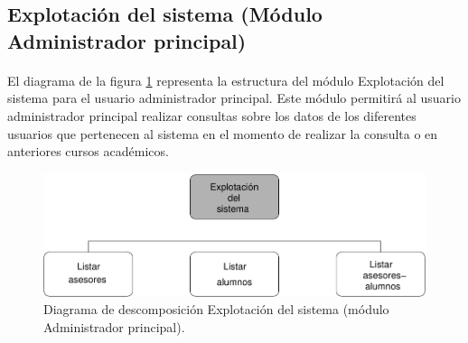 \subsection{Explotación del sistema (Módulo Administrador principal)}

  \paragraph{}El diagrama de la figura
  \ref{diagramaDescomposicionExplotacionSistema} representa la estructura del
  módulo Explotación del sistema para el usuario administrador principal.
  Este módulo permitirá al usuario administrador principal realizar consultas
  sobre los datos de los diferentes usuarios que pertenecen al sistema en el
  momento de realizar la consulta o en anteriores cursos académicos.

  \begin{figure}[!ht]
    \begin{center}
      \includegraphics[]{11.Disenyo_Arquitectonico/11.2.Diagramas_Descomposicion/11.2.2.Modulo_administrador_principal/ExplotacionSistema/Diagramas/explotacion_sistema.pdf}
      \caption{Diagrama de descomposición Explotación del sistema (módulo Administrador principal).}
      \label{diagramaDescomposicionExplotacionSistema}
    \end{center}
  \end{figure}
